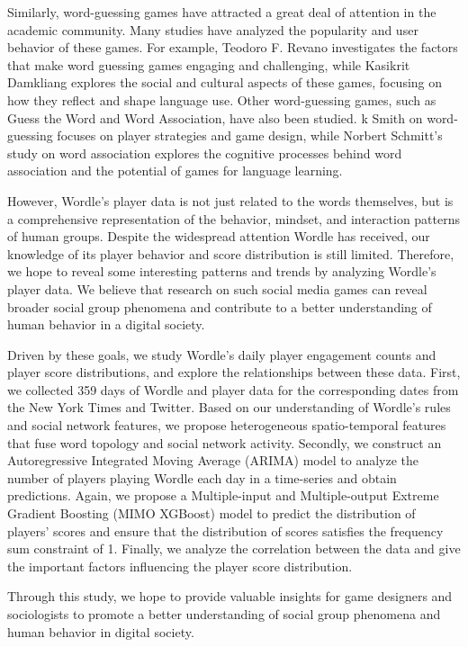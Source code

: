 \documentclass[a4paper]{jpconf}
\begin{document}
Similarly, word-guessing games have attracted a great deal of attention in the academic community. Many studies have analyzed the popularity and user behavior of these games. For example, Teodoro F. Revano \cite{revano2018logical} investigates the factors that make word guessing games engaging and challenging, while Kasikrit Damkliang \cite{damkliang2016guessing} explores the social and cultural aspects of these games, focusing on how they reflect and shape language use. Other word-guessing games, such as Guess the Word and Word Association, have also been studied. k Smith \cite{smith2011cross} on word-guessing focuses on player strategies and game design, while Norbert Schmitt's \cite{schmitt1997researching} study on word association explores the cognitive processes behind word association and the potential of games for language learning.

However, Wordle's player data is not just related to the words themselves, but is a comprehensive representation of the behavior, mindset, and interaction patterns of human groups. Despite the widespread attention Wordle has received, our knowledge of its player behavior and score distribution is still limited. Therefore, we hope to reveal some interesting patterns and trends by analyzing Wordle's player data. We believe that research on such social media games can reveal broader social group phenomena and contribute to a better understanding of human behavior in a digital society.	

Driven by these goals, we study Wordle's daily player engagement counts and player score distributions, and explore the relationships between these data. First, we collected 359 days of Wordle and player data for the corresponding dates from the New York Times and Twitter. Based on our understanding of Wordle's rules and social network features, we propose heterogeneous spatio-temporal features that fuse word topology and social network activity. Secondly, we construct an Autoregressive Integrated Moving Average (ARIMA) model to analyze the number of players playing Wordle each day in a time-series and obtain predictions. Again, we propose a Multiple-input and Multiple-output Extreme Gradient Boosting (MIMO XGBoost) model to predict the distribution of players' scores and ensure that the distribution of scores satisfies the frequency sum constraint of 1. Finally, we analyze the correlation between the data and give the important factors influencing the player score distribution.

Through this study, we hope to provide valuable insights for game designers and sociologists to promote a better understanding of social group phenomena and human behavior in digital society.
\end{document}
